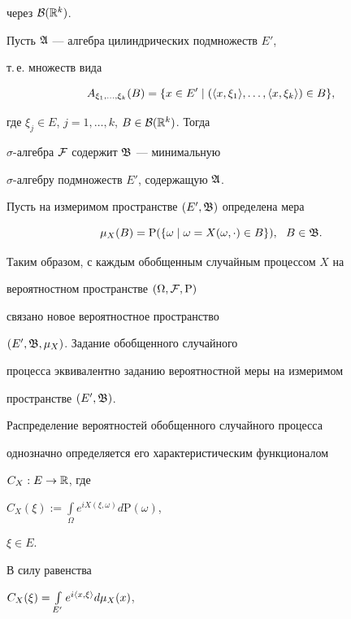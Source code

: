 через ${\cal B}(\Bbb{R}^k)$.


Пусть $\frak{A}$ --- алгебра цилиндрических подмножеств $E'$,


т.\,е. множеств вида


$$


A_{\xi_1,\dotsc, \xi_k}(B)=


\{ x\in E'\mid (\la x,\xi_1\ra, \dotsc,\la x,\xi_k\ra)\in B\},


$$


где $\xi_j\in E$, $j= 1,\dotsc, k$, $B\in {\cal


B}(\Bbb{R}^k)$. Тогда


$\sigma$-алгебра ${\cal F}$ содержит $\frak{B}$ --- минимальную


$\sigma$-алгебру подмножеств $E'$, содержащую $\frak{A}$.


Пусть на измеримом пространстве $(E',


\frak{B})$ определена мера


$$


\mu_X(B) = \mathrm{P} (\{\omega\mid \omega = X(\omega,\cdot) \in B\}),\ \


B \in \frak{B}.


$$





Таким образом, с каждым обобщенным случайным процессом $X$ на


вероятностном пространстве $ (\Omega, {\cal F}, \mathrm{P})$


связано новое вероятностное пространство


$(E', \frak{B}, \mu_X)$. Задание обобщенного случайного


процесса эквивалентно заданию вероятностной меры на измеримом


пространстве $(E', \frak{B})$.





Распределение вероятностей обобщенного случайного процесса


однозначно определяется его характеристическим функционалом


$C_X:E \to \Bbb{R}$, где


$C_X(\xi):=\int\limits_{\Omega} e^{iX(\xi,\omega)} d\mathrm{P}(\omega)$,


$\xi\in E$.


В силу равенства


$C_X(\xi)=\int\limits_{E'} e^{i\langle x,\xi\rangle } d\mu_X(x)$,


